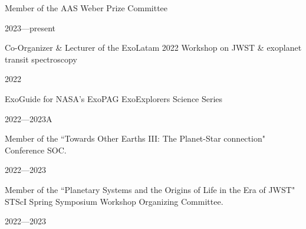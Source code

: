 \documentclass[12pt, a4paper]{article} %
\begin{document}
\begin{minipage}[t]{0.7\textwidth}
\begin{flushleft}%
  \setlength{\leftskip}{0.2cm}%
Member of the AAS Weber Prize Committee
\end{flushleft}
\end{minipage}
\begin{minipage}[t]{0.3\textwidth}
\hfill 2023---present
\end{minipage}

\vspace{0.2cm}

\begin{minipage}[t]{0.7\textwidth}
\begin{flushleft}%
  \setlength{\leftskip}{0.2cm}%
Co-Organizer \& Lecturer of the ExoLatam 2022 Workshop on JWST \& exoplanet transit spectroscopy
\end{flushleft}
\end{minipage}
\begin{minipage}[t]{0.3\textwidth}
\hfill 2022
\end{minipage}

\vspace{0.2cm}

\begin{minipage}[t]{0.7\textwidth}
\begin{flushleft}%
  \setlength{\leftskip}{0.2cm}%
ExoGuide for NASA's ExoPAG ExoExplorers Science Series
\end{flushleft}
\end{minipage}
\begin{minipage}[t]{0.3\textwidth}
\hfill 2022---2023A
\end{minipage}

\vspace{0.2cm}

\begin{minipage}[t]{0.7\textwidth}
\begin{flushleft}%
  \setlength{\leftskip}{0.2cm}%
Member of the ``Towards Other Earths III: The Planet-Star connection" Conference SOC.
\end{flushleft}
\end{minipage}
\begin{minipage}[t]{0.3\textwidth}
\hfill 2022---2023
\end{minipage}

\vspace{0.2cm}

\begin{minipage}[t]{0.7\textwidth}
\begin{flushleft}%
  \setlength{\leftskip}{0.2cm}%
Member of the ``Planetary Systems and the Origins of Life in the Era of JWST" STScI Spring Symposium Workshop Organizing Committee.
\end{flushleft}
\end{minipage}
\begin{minipage}[t]{0.3\textwidth}
\hfill 2022---2023
\end{minipage}
\end{document}
